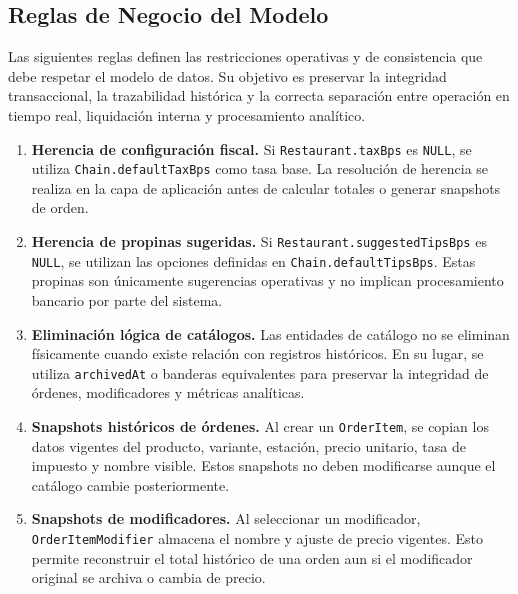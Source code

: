 \newpage
\subsection{Reglas de Negocio del Modelo}

Las siguientes reglas definen las restricciones operativas y de consistencia que debe
respetar el modelo de datos. Su objetivo es preservar la integridad transaccional,
la trazabilidad histórica y la correcta separación entre operación en tiempo real,
liquidación interna y procesamiento analítico.

\begin{enumerate}
  \item \textbf{Herencia de configuración fiscal.}
  Si \texttt{Restaurant.taxBps} es \texttt{NULL}, se utiliza \texttt{Chain.defaultTaxBps}
  como tasa base. La resolución de herencia se realiza en la capa de aplicación antes
  de calcular totales o generar snapshots de orden.

  \item \textbf{Herencia de propinas sugeridas.}
  Si \texttt{Restaurant.suggestedTipsBps} es \texttt{NULL}, se utilizan las opciones
  definidas en \texttt{Chain.defaultTipsBps}. Estas propinas son únicamente sugerencias
  operativas y no implican procesamiento bancario por parte del sistema.

  \item \textbf{Eliminación lógica de catálogos.}
  Las entidades de catálogo no se eliminan físicamente cuando existe relación con
  registros históricos. En su lugar, se utiliza \texttt{archivedAt} o banderas equivalentes
  para preservar la integridad de órdenes, modificadores y métricas analíticas.

  \item \textbf{Snapshots históricos de órdenes.}
  Al crear un \texttt{OrderItem}, se copian los datos vigentes del producto, variante,
  estación, precio unitario, tasa de impuesto y nombre visible. Estos snapshots no deben
  modificarse aunque el catálogo cambie posteriormente.

  \item \textbf{Snapshots de modificadores.}
  Al seleccionar un modificador, \texttt{OrderItemModifier} almacena el nombre y ajuste
  de precio vigentes. Esto permite reconstruir el total histórico de una orden aun si el
  modificador original se archiva o cambia de precio.


\end{enumerate}
